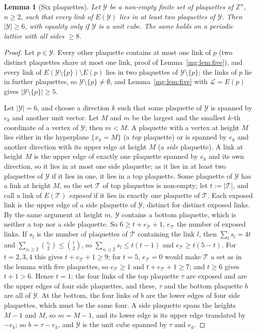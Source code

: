 \documentclass[11pt,a4paper]{article}
\newtheorem{lemma}[theorem]{Lemma}
\theoremstyle{definition}
\theoremstyle{remark}
\newcommand{\Z}{\mathbb{Z}}
\begin{document}
\begin{lemma}[Six plaquettes]\label{mg:lem:sixplaq}
Let $\mathcal Y$ be a non-empty finite set of plaquettes of $\Z^n$, $n\ge2$, such that every link of $E(\mathcal Y)$ lies in at least two plaquettes of
$\mathcal Y$. Then $|\mathcal Y|\ge6$, with equality only if $\mathcal Y$ is a unit cube. The same holds on a periodic lattice with all sides $\ge8$.
\end{lemma}

\begin{proof}
Let $p\in\mathcal Y$. Every other plaquette contains at most one link of $p$ (two distinct plaquettes share at most one link, proof of
Lemma~\ref{mg:lem:five}), and every link of $E(\mathcal Y\setminus\{p\})\setminus E(p)$ lies in two plaquettes of $\mathcal Y\setminus\{p\}$; the links of $p$ lie in
further plaquettes, so $\mathcal Y\setminus\{p\}\neq\emptyset$, and Lemma~\ref{mg:lem:five} with $\mathcal L=E(p)$ gives $|\mathcal Y\setminus\{p\}|\ge5$.

Let $|\mathcal Y|=6$, and choose a direction $k$ such that some plaquette of $\mathcal Y$ is spanned by $e_k$ and another unit vector. Let $M$ and $m$ be the
largest and the smallest $k$-th coordinate of a vertex of $\mathcal Y$; then $m<M$. A plaquette with a vertex at height $M$ lies either in the hyperplane
$\{x_k=M\}$ (a \emph{top} plaquette) or is spanned by $e_k$ and another direction with its upper edge at height $M$ (a \emph{side} plaquette). A link at
height $M$ is the upper edge of exactly one plaquette spanned by $e_k$ and its own direction, so it lies in at most one side plaquette; as it lies in at least
two plaquettes of $\mathcal Y$ if it lies in one, it lies in a top plaquette. Some plaquette of $\mathcal Y$ has a link at height $M$, so the set $\mathcal T$ of
top plaquettes is non-empty; let $t:=|\mathcal T|$, and call a link of $E(\mathcal T)$ \emph{exposed} if it lies in exactly one plaquette of $\mathcal T$.
Each exposed link is the upper edge of a side plaquette of $\mathcal Y$, distinct for distinct exposed links. By the same argument at height $m$, $\mathcal Y$
contains a bottom plaquette, which is neither a top nor a side plaquette. So $6\ge t+e_{\mathcal T}+1$, $e_{\mathcal T}$ the number of exposed links. If
$s_l$ is the number of plaquettes of $\mathcal T$ containing the link $l$, then $\sum_ls_l=4t$ and $\sum_{s_l\ge2}\binom{s_l}2\le\binom t2$, so
$\sum_{s_l\ge2}s_l\le t(t-1)$ and $e_{\mathcal T}\ge t(5-t)$. For $t=2,3,4$ this gives $t+e_{\mathcal T}+1\ge9$; for $t=5$, $e_{\mathcal T}=0$ would make
$\mathcal T$ a set as in the lemma with five plaquettes, so $e_{\mathcal T}\ge1$ and $t+e_{\mathcal T}+1\ge7$; and $t\ge6$ gives $t+1>6$. Hence $t=1$: the four links of the top
plaquette $\tau$ are exposed and are the upper edges of four side plaquettes, and these, $\tau$ and the bottom plaquette $b$ are all of $\mathcal Y$. At the
bottom, the four links of $b$ are the lower edges of four side plaquettes, which must be the same four. A side plaquette spans the heights $M-1$ and $M$, so
$m=M-1$, and its lower edge is its upper edge translated by $-e_k$; so $b=\tau-e_k$, and $\mathcal Y$ is the unit cube spanned by $\tau$ and $e_k$.


\end{proof}
\end{document}
